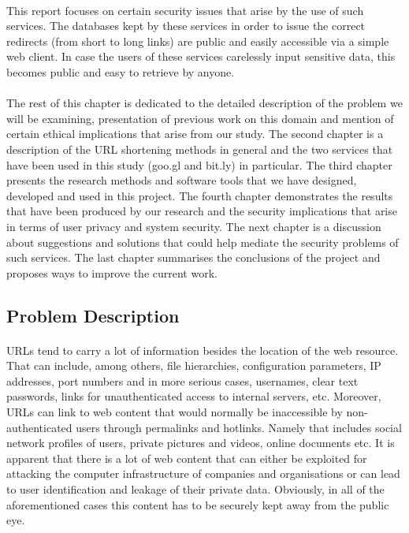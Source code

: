 \documentclass[12pt]{article}
\begin{document}
\paragraph{}
This report focuses on certain security issues that arise by the use of such services. The databases kept by these services in order to issue the correct redirects (from short to long links) are public and easily accessible via a simple web client. In case the users of these services carelessly input sensitive data, this becomes public and easy to retrieve by anyone.
\paragraph{} 
The rest of this chapter is dedicated to the detailed description of the problem we will be examining, presentation of previous work on this domain and mention of certain ethical implications that arise from our study. The second chapter is a description of the URL shortening methods in general and the two services that have been used in this study (goo.gl and bit.ly) in particular. The third chapter presents the research methods and software tools that we have designed, developed and used in this project. The fourth chapter demonstrates the results that have been produced by our research and the security implications that arise in terms of user privacy and system security. The next chapter is a discussion about suggestions and solutions that could help mediate the security problems of such services. The last chapter summarises the conclusions of the project and proposes ways to improve the current work. 
\newpage
\subsection{Problem Description}

\paragraph{}
URLs tend to carry a lot of information besides the location of the web resource. That can include, among others, file hierarchies, configuration parameters, IP addresses, port numbers and in more serious cases, usernames, clear text passwords, links for unauthenticated access to internal servers, etc. Moreover, URLs can link to web content that would normally be inaccessible by non-authenticated users through permalinks and hotlinks. Namely that includes social network profiles of users, private pictures and videos, online documents etc. It is apparent that there is a lot of web content that can either be exploited for attacking the computer infrastructure of companies and organisations or can lead to user identification and leakage of their private data. Obviously, in all of the aforementioned cases this content has to be securely kept away from the public eye.
\end{document}
